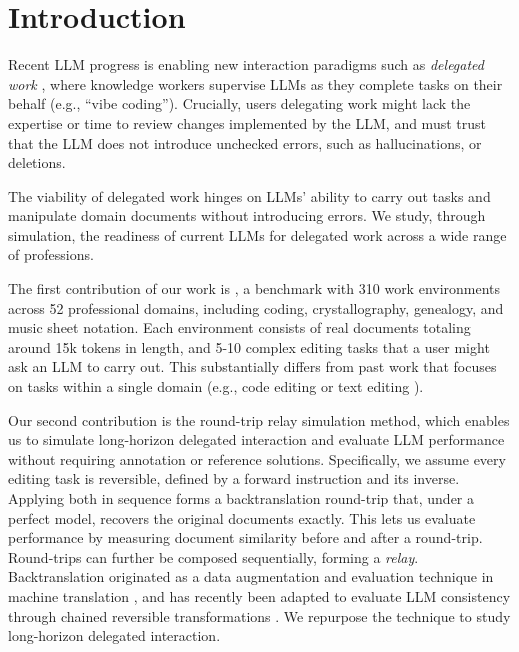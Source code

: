 \documentclass{article} %
\begin{document}
\section{Introduction} \label{sec:intro}

Recent LLM progress is enabling new interaction paradigms such as \textit{delegated work} \citep{Shao2025FutureOW, Ulloa2025ProductMP}, where knowledge workers supervise LLMs as they complete tasks on their behalf (e.g., ``vibe coding''). Crucially, users delegating work might lack the expertise or time to review changes implemented by the LLM, and must trust that the LLM does not introduce unchecked errors, such as hallucinations, or deletions.

The viability of delegated work hinges on LLMs' ability to carry out tasks and manipulate domain documents without introducing errors. We study, through simulation, the readiness of current LLMs for delegated work across a wide range of professions.

The first contribution of our work is \benchmark{}, a benchmark with 310 work environments across 52 professional domains, including coding, crystallography, genealogy, and music sheet notation. Each environment consists of real documents totaling around 15k tokens in length, and 5-10 complex editing tasks that a user might ask an LLM to carry out. This substantially differs from past work that focuses on tasks within a single domain (e.g., code editing \citep{Cassano2023CanIE} or text editing \citep{Spangher2022NewsEditsAN}).

Our second contribution is the round-trip relay simulation method, which enables us to simulate long-horizon delegated interaction and evaluate LLM performance without requiring annotation or reference solutions. Specifically, we assume every editing task is reversible, defined by a forward instruction and its inverse. Applying both in sequence forms a backtranslation round-trip that, under a perfect model, recovers the original documents exactly. This lets us evaluate performance by measuring document similarity before and after a round-trip. Round-trips can further be composed sequentially, forming a \textit{relay}. Backtranslation originated as a data augmentation and evaluation technique in machine translation \citep{Sennrich2015ImprovingNM,Somers2005RoundtripTW}, and has recently been adapted to evaluate LLM consistency through chained reversible transformations \citep{Hong2025ConsistencyCheckerTE,Allamanis2024UnsupervisedEO}. We repurpose the technique to study long-horizon delegated interaction. %
\end{document}
